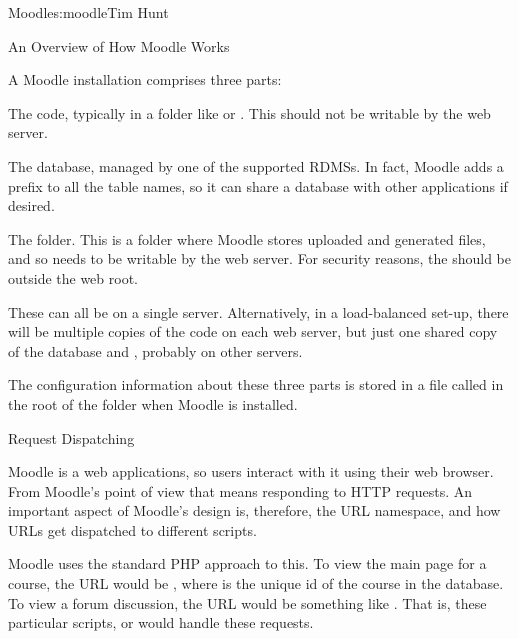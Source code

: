 \begin{aosachapter}{Moodle}{s:moodle}{Tim Hunt}
\begin{aosasect1}{An Overview of How Moodle Works}

A Moodle installation comprises three parts:

\begin{aosaenumerate}

\item The code, typically in a folder like  or
  . This should not be writable
  by the web server.

\item The database, managed by one of the supported RDMSs. In fact,
  Moodle adds a prefix to all the table names, so it can share a
  database with other applications if desired.

\item The  folder. This is a folder where Moodle
  stores uploaded and generated files, and so needs to be writable by
  the web server. For security reasons, the should be outside the web
  root.

\end{aosaenumerate}

These can all be on a single server. Alternatively, in a load-balanced
set-up, there will be multiple copies of the code on each web server,
but just one shared copy of the database and , probably on
other servers.

The configuration information about these three parts is stored in a
file called  in the root of the  folder when
Moodle is installed.

\begin{aosasect2}{Request Dispatching}

Moodle is a web applications, so users interact with it using their
web browser. From Moodle's point of view that means responding to HTTP
requests. An important aspect of Moodle's design is, therefore, the
URL namespace, and how URLs get dispatched to different scripts.

Moodle uses the standard PHP approach to this. To view the main page
for a course, the URL would be ,
where  is the unique id of the course in \linebreak
the database. To
view a forum discussion, the URL would be something like
\linebreak 
{}. That is, these particular
scripts,  or  would
handle these requests. 


\end{aosasect2}
\end{aosasect1}
\end{aosachapter}

